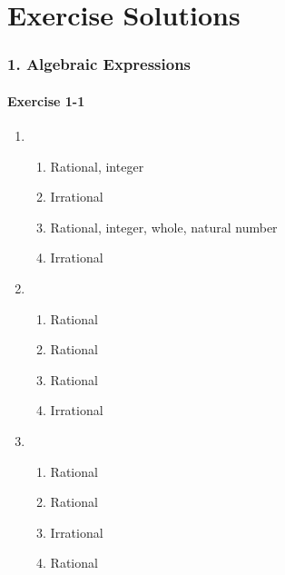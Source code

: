 
\chapter{Exercise Solutions}
\footnotesize{
\subsection*{1. Algebraic Expressions}
\begin{multicols}{3}
\subsubsection*{Exercise 1-1} %

\begin{enumerate}[noitemsep, label=\textbf{\arabic*}. ] 
\item %
  \begin{enumerate}[noitemsep, label=\textbf{(\alph*)} ] 
    \item Rational, integer%
    \item Irrational%
    \item Rational, integer, whole, natural number%
    \item Irrational %
  \end{enumerate}  
\item %
  \begin{enumerate}[noitemsep, label=\textbf{(\alph*)} ] 
    \item Rational
    \item Rational
    \item Rational
    \item Irrational
    \end{enumerate}
\item %
    \begin{enumerate}[noitemsep, label=\textbf{(\alph*)} ] 
    \item Rational
    \item Rational
    \item Irrational
    \item Rational
    \end{enumerate}


\end{enumerate}
\end{multicols}}
